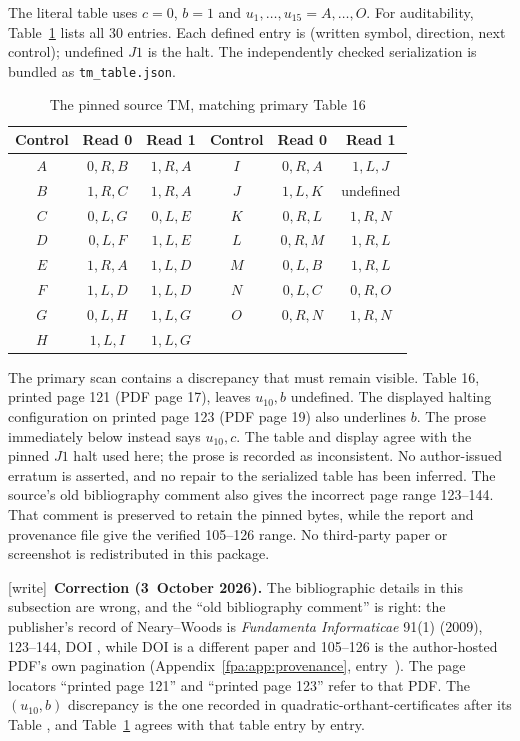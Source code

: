 \documentclass[11pt,a4paper]{article}
\numberwithin{equation}{section}
\newcommand{\wtag}{\textup{[write]}}
\begin{document}
The literal table uses $c=0$, $b=1$ and $u_1,\ldots,u_{15}=A,\ldots,O$.
For auditability, Table~\ref{fpa:bc:tab:tm} lists all 30 entries. Each defined entry
is (written symbol, direction, next control); undefined $J1$ is the halt.
The independently checked serialization is bundled as \texttt{tm\_table.json}.
\begin{table}[htbp]\centering
\caption{The pinned source TM, matching primary Table 16}\label{fpa:bc:tab:tm}
\begin{tabular}{ccc@{\qquad}ccc}
\toprule
Control&Read 0&Read 1&Control&Read 0&Read 1\\
\midrule
$A$&$0,R,B$&$1,R,A$&$I$&$0,R,A$&$1,L,J$\\
$B$&$1,R,C$&$1,R,A$&$J$&$1,L,K$&undefined\\
$C$&$0,L,G$&$0,L,E$&$K$&$0,R,L$&$1,R,N$\\
$D$&$0,L,F$&$1,L,E$&$L$&$0,R,M$&$1,R,L$\\
$E$&$1,R,A$&$1,L,D$&$M$&$0,L,B$&$1,R,L$\\
$F$&$1,L,D$&$1,L,D$&$N$&$0,L,C$&$0,R,O$\\
$G$&$0,L,H$&$1,L,G$&$O$&$0,R,N$&$1,R,N$\\
$H$&$1,L,I$&$1,L,G$&&&\\
\bottomrule
\end{tabular}
\end{table}

The primary scan contains a discrepancy that must remain visible. Table 16,
printed page 121 (PDF page 17), leaves $u_{10},b$ undefined. The displayed
halting configuration on printed page 123 (PDF page 19) also underlines $b$.
The prose immediately below instead says $u_{10},c$. The table and display
agree with the pinned $J1$ halt used here; the prose is recorded as inconsistent.
No author-issued erratum is asserted, and no repair to the serialized table
has been inferred. The source's old bibliography comment also gives the
incorrect page range 123--144. That comment is preserved to retain the pinned
bytes, while the report and provenance file give the verified 105--126 range.
No third-party paper or screenshot is redistributed in this package.

\wtag\ \textbf{Correction (3~October 2026).} The bibliographic details in this subsection are wrong, and the ``old bibliography comment'' is right: the publisher's record of Neary--Woods is \emph{Fundamenta Informaticae} 91(1) (2009), 123--144, DOI , while DOI  is a different paper and 105--126 is the author-hosted PDF's own pagination (Appendix~\ref{fpa:app:provenance}, entry~\cite{fpa:nw}). The page locators ``printed page 121'' and ``printed page 123'' refer to that PDF. The $(u_{10},b)$ discrepancy is the one recorded in quadratic-orthant-certificates after its Table , and Table~\ref{fpa:bc:tab:tm} agrees with that table entry by entry.
\end{document}
